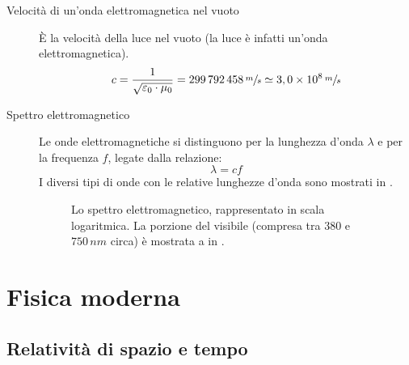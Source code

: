 \documentclass[a4paper,11pt,italian]{article}
\begin{document}
\begin{description}
  \item[Velocità di un'onda elettromagnetica nel vuoto] 
  È la velocità della luce nel vuoto (la luce è infatti un'onda elettromagnetica).
  \[ c = \frac{1}{\sqrt{\varepsilon_0\cdot \mu_0}} =299\,  792\, 458\,	\sfrac{m}{s} \simeq 3,0 \times 10^8 \,	\sfrac{m}{s} \]
  
  \item[Spettro elettromagnetico] 
  Le onde elettromagnetiche si distinguono per la lunghezza d'onda $ \lambda $ e per la frequenza $ f $, legate dalla relazione:
  \[ \lambda = c f \]
  I diversi tipi di onde con le relative lunghezze d'onda sono mostrati in .

\begin{figure}[htp]\centering
\begin{tikzpicture}[fill between/on layer={axis grid}]

\end{tikzpicture}
\caption{Lo spettro elettromagnetico, rappresentato in scala logaritmica. La porzione del visibile (compresa tra $ 380 $ e $ 750 \, nm $ circa) è mostrata a  in .}
\label{img:spettroelettromagnetico}
\end{figure}
  
%   
\end{description}


\newpage
\section{Fisica moderna}

\subsection{Relatività di spazio e tempo}
\end{document}
